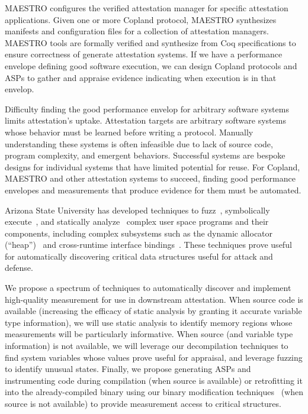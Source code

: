 \documentclass[runningheads]{llncs}
\begin{document}
MAESTRO configures the verified attestation manager for specific attestation
applications.  Given one or more Copland protocol, MAESTRO synthesizes manifests
and configuration files for a collection of attestation managers. MAESTRO tools
are formally verified and synthesize from Coq specifications to ensure
correctness of generate attestation systems.  If we have a performance envelope
defining good software execution, we can design Copland protocols and ASPs to
gather and appraise evidence indicating  when execution is in that envelop.

Difficulty finding the good performance envelop for arbitrary software systems
limits attestation's uptake.  Attestation targets are arbitrary software systems
whose behavior must be learned before writing a protocol.  Manually
understanding these systems is often infeasible due to lack of source code,
program complexity, and emergent behaviors.  Successful systems are bespoke
designs for individual systems that have limited potential for reuse.  For
Copland, MAESTRO and other attestation systems to succeed, finding good
performance envelopes and measurements that produce evidence for them must be
automated.

Arizona State University has developed
techniques to fuzz~\citep{trickel2022toss,salls2020exploring,peng2018t}, symbolically execute~\citep{stephens2016driller,shoshitaishvili2016sok}, and statically analyze~\citep{das2022hybrid,vadayath2022arbiter} complex user space programs and their components, including complex subsystems such as the dynamic allocator (``heap'')~\citep{eckert2018heaphopper} and cross-runtime interface bindings~\citep{dinh2021favocado}.
These techniques prove useful for automatically discovering critical data structures useful for attack and defense.

We propose a spectrum of techniques to automatically discover and
implement high-quality measurement for use in downstream attestation.
When source code is available (increasing the efficacy of static analysis by granting it accurate variable type information), we will use static analysis to identify memory regions whose measurements will be particularly informative.
When source (and variable type information) is not available, we will leverage our decompilation techniques to find system variables whose values prove useful for appraisal, and leverage fuzzing to identify unusual states.
Finally, we propose generating ASPs and instrumenting code during compilation (when source is available) or retrofitting it into the already-compiled binary using our binary modification techniques~\citep{wang2017ramblr} (when source is not available) to provide measurement access to critical structures.
\end{document}

